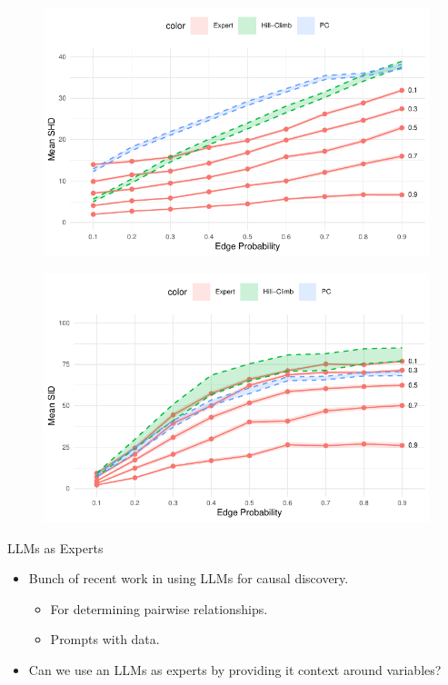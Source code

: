 \documentclass{beamer}
\begin{document}
\begin{frame}
	\begin{figure}
		\centering
		\includegraphics[scale=1]{shd_ribbon.pdf}
	\end{figure}
\end{frame}

\begin{frame}
	\begin{figure}
		\centering
		\includegraphics[scale=1]{sid_ribbon.pdf}
	\end{figure}
\end{frame}

\begin{frame}{LLMs as Experts}
	\begin{itemize}
		\item Bunch of recent work in using LLMs for causal discovery.
			\begin{itemize}
				\item For determining pairwise relationships.
				\item Prompts with data.
			\end{itemize}
		\item Can we use an LLMs as experts by providing it context around variables?
	\end{itemize}
\end{frame}
\end{document}

